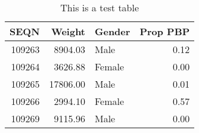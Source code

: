 \begin{table}[h]
\caption{This is a test table}
\label{test_table}
\begin{tabular}{rrlr}
\toprule
SEQN & Weight & Gender & Prop PBP \\
\midrule
109263 & 8904.03 & Male & 0.12 \\
109264 & 3626.88 & Female & 0.00 \\
109265 & 17806.00 & Male & 0.01 \\
109266 & 2994.10 & Female & 0.57 \\
109269 & 9115.96 & Male & 0.00 \\
\bottomrule
\end{tabular}
\end{table}
